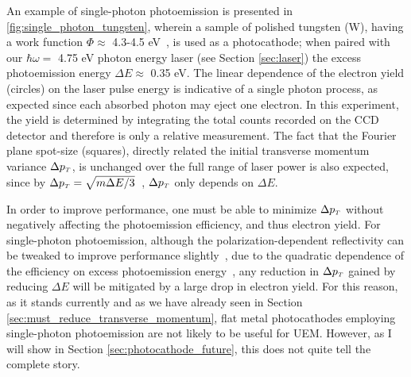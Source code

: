 An example of single-photon photoemission is presented in \ref{fig:single_photon_tungsten}, wherein a sample of polished tungsten (W), having a work function $\Phi \approx $ 4.3-4.5 eV~\cite{yen_thermally_1980}, is used as a photocathode; when paired with our $\hbar \omega = $ 4.75 eV photon energy laser (see Section \ref{sec:laser}) the excess photoemission energy $\Delta E \approx $ 0.35 eV.
The linear dependence of the electron yield (circles) on the laser pulse energy is indicative of a single photon process, as expected since each absorbed photon may eject one electron.
In this experiment, the yield is determined by integrating the total counts recorded on the CCD detector and therefore is only a relative measurement.
The fact that the Fourier plane spot-size (squares), directly related the initial transverse momentum variance $\Delta p_{{\scriptscriptstyle T}}$, is unchanged over the full range of laser power is also expected, since by $\Delta p_{{\scriptscriptstyle T}} = \sqrt{ m \Delta E / 3 } $~\cite{dowell_quantum_2009}, $\Delta p_{{\scriptscriptstyle T}}$ only depends on $\Delta E$.

In order to improve performance, one must be able to minimize $\Delta p_{{\scriptscriptstyle T}}$ without negatively affecting the photoemission efficiency, and thus electron yield.
For single-photon photoemission, although the polarization-dependent reflectivity can be tweaked to improve performance slightly~\cite{berger_dc_2009}, due to the quadratic dependence of the efficiency on excess photoemission energy~\cite{shalaev_electron_1994}, any reduction in $\Delta p_{{\scriptscriptstyle T}}$ gained by reducing $\Delta E$ will be mitigated by a large drop in electron yield.
For this reason, as it stands currently and as we have already seen in Section \ref{sec:must_reduce_transverse_momentum}, flat metal photocathodes employing single-photon photoemission are not likely to be useful for UEM.
However, as I will show in Section \ref{sec:photocathode_future}, this does not quite tell the complete story.

